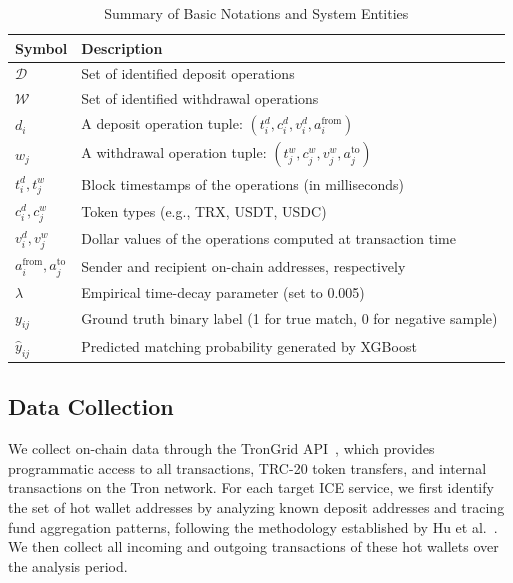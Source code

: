 \documentclass[journal]{IEEEtran}
\begin{document}
    \begin{table}[htbp]
    \renewcommand{\arraystretch}{1.2}
    \caption{Summary of Basic Notations and System Entities}
    \label{tab:basic_notation}
    \centering
    \small
    \begin{tabular}{l p{}}
    \toprule
    \textbf{Symbol} & \textbf{Description} \\
    \midrule
    $\mathcal{D}$ & Set of identified deposit operations \\
    $\mathcal{W}$ & Set of identified withdrawal operations \\
    $d_i$ & A deposit operation tuple: $(t_i^d, c_i^d, v_i^d, a_i^{\text{from}})$ \\
    $w_j$ & A withdrawal operation tuple: $(t_j^w, c_j^w, v_j^w, a_j^{\text{to}})$ \\
    \addlinespace
    $t_i^d, t_j^w$ & Block timestamps of the operations (in milliseconds) \\
    $c_i^d, c_j^w$ & Token types (e.g., TRX, USDT, USDC) \\
    $v_i^d, v_j^w$ & Dollar values of the operations computed at transaction time \\
    $a_i^{\text{from}}, a_j^{\text{to}}$ & Sender and recipient on-chain addresses, respectively \\
    \addlinespace
    $\lambda$ & Empirical time-decay parameter (set to 0.005) \\
    $y_{ij}$ & Ground truth binary label (1 for true match, 0 for negative sample) \\
    $\hat{y}_{ij}$ & Predicted matching probability generated by XGBoost \\
    \bottomrule
    \end{tabular}
    \end{table}
    
    \subsection{Data Collection}
    We collect on-chain data through the TronGrid API~\cite{trongrid2024}, which provides programmatic access to all transactions, TRC-20 token transfers, and internal transactions on the Tron network. For each target ICE service, we first identify the set of hot wallet addresses by analyzing known deposit addresses and tracing fund aggregation patterns, following the methodology established by Hu et al.~\cite{hu2024ice}. We then collect all incoming and outgoing transactions of these hot wallets over the analysis period.
    
\end{document}
